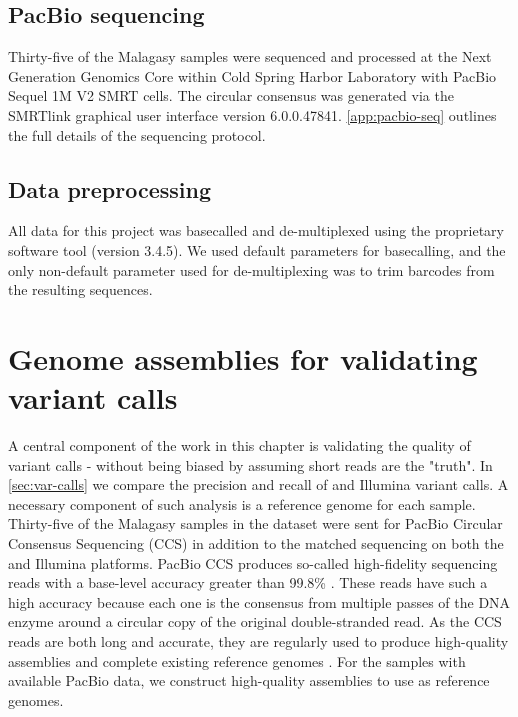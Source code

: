 \subsection{PacBio sequencing}
Thirty-five of the Malagasy samples were sequenced and processed at the Next Generation Genomics Core within Cold Spring Harbor Laboratory with PacBio Sequel 1M V2 SMRT cells. The circular consensus was generated via the SMRTlink graphical user interface version 6.0.0.47841. \autoref{app:pacbio-seq} outlines the full details of the sequencing protocol.

\subsection{Data preprocessing}

All \ont{} data for this project was basecalled and de-multiplexed using the \ont{} proprietary software tool \guppy{} (version 3.4.5). We used default parameters for basecalling, and the only non-default parameter used for de-multiplexing was to trim barcodes from the resulting sequences.  


\section{Genome assemblies for validating variant calls}
\label{sec:asm_results}
A central component of the work in this chapter is validating the quality of variant calls - without being biased by assuming short reads are the "truth". In \autoref{sec:var-calls} we compare the precision and recall of \ont{} and Illumina variant calls. A necessary component of such analysis is a reference genome for each sample. Thirty-five of the Malagasy samples in the dataset were sent for PacBio Circular Consensus Sequencing (CCS) in addition to the matched sequencing on both the \ont{} and Illumina platforms. PacBio CCS produces so-called high-fidelity sequencing reads with a base-level accuracy greater than 99.8\% \cite{wenger2019}. These reads have such a high accuracy because each one is the consensus from multiple passes of the DNA enzyme around a circular copy of the original double-stranded read. As the CCS reads are both long and accurate, they are regularly used to produce high-quality \denovo{} assemblies and complete existing reference genomes \cite{garg2021,masonbrink2021}. For the samples with available PacBio data, we construct high-quality assemblies to use as reference genomes.

